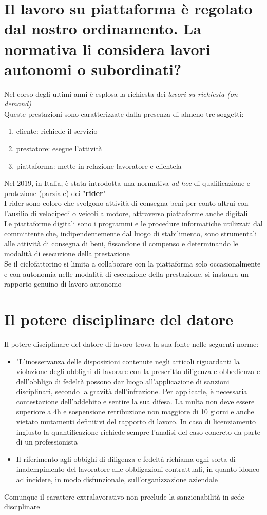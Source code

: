 \documentclass[8pt,oneside,a4paper]{article}
\begin{document}
	\section{Il lavoro su piattaforma è regolato dal nostro ordinamento. La normativa li considera lavori autonomi o subordinati?}
	Nel corso degli ultimi anni è esplosa la richiesta dei \textit{lavori su richiesta (on demand)}\\
	Queste prestazioni sono caratterizzate dalla presenza di almeno tre soggetti:
	\begin{enumerate}
		\item cliente: richiede il servizio
		\item prestatore: esegue l'attività
		\item piattaforma: mette in relazione lavoratore e clientela
	\end{enumerate}
	Nel 2019, in Italia, è stata introdotta una normativa \textit{ad hoc} di qualificazione e protezione (parziale) dei "\textbf{rider}"\\
	I rider sono coloro che svolgono attività di consegna beni per conto altrui con l'ausilio di velocipedi o veicoli a motore, attraverso piattaforme anche digitali\\
	Le piattaforme digitali sono i programmi e le procedure informatiche utilizzati dal committente che, indipendentemente dal luogo di stabilimento, sono strumentali alle attività di consegna di beni, fissandone il compenso e determinando le modalità di esecuzione della prestazione\\
	Se il ciclofattorino si limita a collaborare con la piattaforma solo occasionalmente e con autonomia nelle modalità di esecuzione della prestazione, si instaura un rapporto genuino di lavoro autonomo
	\section{Il potere disciplinare del datore}
	Il potere disciplinare del datore di lavoro trova la sua fonte nelle seguenti norme:
	\begin{itemize}
		\item "L'inosservanza delle disposizioni contenute negli articoli riguardanti la violazione degli obblighi di lavorare con la prescritta diligenza e obbedienza e dell'obbligo di fedeltà possono dar luogo all'applicazione di sanzioni disciplinari, secondo la gravità dell'infrazione. Per applicarle, è necessaria contestazione dell'addebito e sentire la sua difesa. La multa non deve essere superiore a 4h e sospensione retribuzione non maggiore di 10 giorni e anche vietato mutamenti definitivi del rapporto di lavoro. In caso di licenziamento ingiusto la quantificazione richiede sempre l'analisi del caso concreto da parte di un professionista
		\item Il riferimento agli obbighi di diligenza e fedeltà richiama ogni sorta di inadempimento del lavoratore alle obbligazioni contrattuali, in quanto idoneo ad incidere, in modo disfunzionale, sull'organizzazione aziendale
	\end{itemize}
	Comunque il carattere extralavorativo non preclude la sanzionabilità in sede disciplinare
\end{document}
